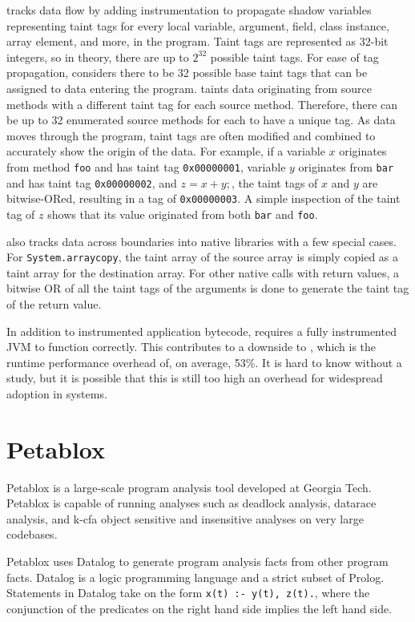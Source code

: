 \phosphor{} tracks data flow by adding instrumentation to propagate
shadow variables representing taint tags for every local variable,
argument, field, class instance, array element, and more, in the
program. Taint tags are represented as 32-bit integers, so in theory,
there are up to $2^{32}$ possible taint tags. For ease of tag
propagation, \phosphor{} considers there to be 32 possible base taint
tags that can be assigned to data entering the program. \phosphor{}
taints data originating from source methods with a different taint tag
for each source method. Therefore, there can be up to 32 enumerated
source methods for each to have a unique tag. As data moves through
the program, taint tags are often modified and combined to accurately
show the origin of the data. For example, if a variable $x$ originates
from method \texttt{foo} and has taint tag \texttt{0x00000001},
variable $y$ originates from \texttt{bar} and has taint tag
\texttt{0x00000002}, and $z = x + y;$, the taint tags of $x$ and $y$
are bitwise-ORed, resulting in a tag of \texttt{0x00000003}. A simple
inspection of the taint tag of $z$ shows that its value originated
from both \texttt{bar} and \texttt{foo}.

\phosphor{} also tracks data across boundaries into native libraries
with a few special cases. For \texttt{System.arraycopy}, the taint
array of the source array is simply copied as a taint array for the
destination array. For other native calls with return values, a
bitwise OR of all the taint tags of the arguments is done to generate
the taint tag of the return value.

In addition to instrumented application bytecode, \phosphor{} requires
a fully instrumented JVM to function correctly. This contributes to a
downside to \phosphor{}, which is the runtime performance overhead of,
on average, 53\%. It is hard to know without a study, but it is
possible that this is still too high an overhead for widespread
adoption in systems.

\section{Petablox}
Petablox \cite{petablox} is a large-scale program analysis tool
developed at Georgia Tech. Petablox is capable of running analyses
such as deadlock analysis, datarace analysis, and k-cfa object
sensitive and insensitive analyses on very large codebases.

Petablox uses Datalog \cite{datalog} to generate program analysis
facts from other program facts. Datalog is a logic programming
language and a strict subset of Prolog. Statements in Datalog take on
the form \texttt{x(t) :- y(t), z(t).}, where the conjunction of the
predicates on the right hand side implies the left hand side.

